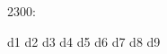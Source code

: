 \documentclass[11pt]{article}
\begin{document}
2300:

d1 \metra{\b}
d2 \metra{\mb}
d3 \metra{\bm}
d4 \metra{\mbb}
d5 \metra{\bbm}
d6 \metra{\bb}
d7 \metra{\tsbm}
d8 \metra{\tsmm}
d9 \metra{\ps}
\end{document}
